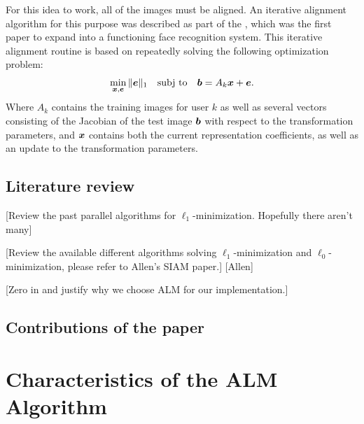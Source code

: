 \documentclass[10pt,twocolumn,letterpaper]{article}
\begin{document}
For this idea to work, all of the images must be aligned. An iterative alignment
algorithm for this purpose was described as part of the \cite{Wagner2009-CVPR}, which was
the first paper to expand \cite{Wright2009-PAMI} into a functioning face recognition system.
This iterative alignment routine is based on repeatedly solving the following optimization problem:
\begin{equation}
\min_{{\boldsymbol{x}}, \boldsymbol{e}} \|\boldsymbol{e}\|_1 \quad \textup{subj to} \quad \boldsymbol{b} = A_k {\boldsymbol{x}} + \boldsymbol{e}.
\end{equation}
Where $A_k$ contains the training images for user $k$ as well as several vectors consisting of the
Jacobian of the test image $\boldsymbol{b}$ with respect to the transformation parameters, and ${\boldsymbol{x}}$ contains
both the current representation coefficients, as well as an update to the transformation parameters.

\subsection{Literature review}
[Review the past parallel algorithms for $\ell_1$-minimization. Hopefully there aren't many]

[Review the available different algorithms solving $\ell_1$-minimization and $\ell_0$-minimization, please refer to Allen's SIAM paper.]
[Allen]

[Zero in and justify why we choose ALM for our implementation.]

\subsection{Contributions of the paper}

\section{Characteristics of the ALM Algorithm}



\end{document}
